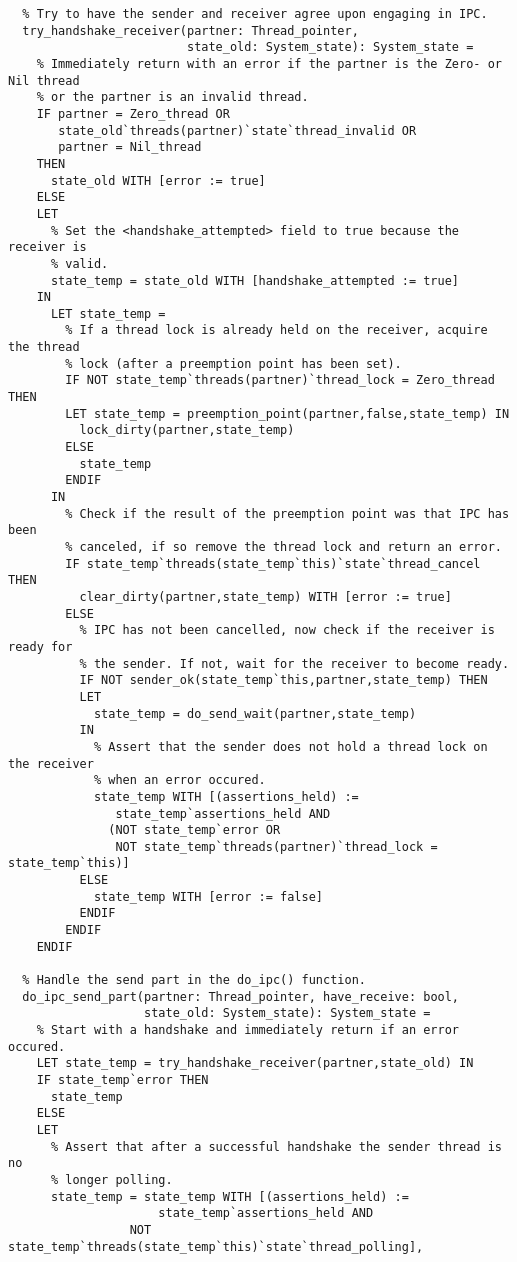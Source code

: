 \begin{lstlisting}
  % Try to have the sender and receiver agree upon engaging in IPC.
  try_handshake_receiver(partner: Thread_pointer, 
                         state_old: System_state): System_state =
    % Immediately return with an error if the partner is the Zero- or Nil thread
    % or the partner is an invalid thread.
    IF partner = Zero_thread OR
       state_old`threads(partner)`state`thread_invalid OR 
       partner = Nil_thread
    THEN
      state_old WITH [error := true]
    ELSE
    LET 
      % Set the <handshake_attempted> field to true because the receiver is 
      % valid.
      state_temp = state_old WITH [handshake_attempted := true] 
    IN
      LET state_temp = 
        % If a thread lock is already held on the receiver, acquire the thread 
        % lock (after a preemption point has been set).
        IF NOT state_temp`threads(partner)`thread_lock = Zero_thread THEN
        LET state_temp = preemption_point(partner,false,state_temp) IN
          lock_dirty(partner,state_temp)
        ELSE
          state_temp
        ENDIF
      IN
        % Check if the result of the preemption point was that IPC has been 
        % canceled, if so remove the thread lock and return an error.
        IF state_temp`threads(state_temp`this)`state`thread_cancel THEN
          clear_dirty(partner,state_temp) WITH [error := true]
        ELSE
          % IPC has not been cancelled, now check if the receiver is ready for
          % the sender. If not, wait for the receiver to become ready.
          IF NOT sender_ok(state_temp`this,partner,state_temp) THEN
          LET
            state_temp = do_send_wait(partner,state_temp)
          IN
            % Assert that the sender does not hold a thread lock on the receiver
            % when an error occured.
            state_temp WITH [(assertions_held) :=
               state_temp`assertions_held AND 
              (NOT state_temp`error OR 
               NOT state_temp`threads(partner)`thread_lock = state_temp`this)]
          ELSE
            state_temp WITH [error := false]
          ENDIF
        ENDIF
    ENDIF 

  % Handle the send part in the do_ipc() function.
  do_ipc_send_part(partner: Thread_pointer, have_receive: bool, 
                   state_old: System_state): System_state =
    % Start with a handshake and immediately return if an error occured.
    LET state_temp = try_handshake_receiver(partner,state_old) IN
    IF state_temp`error THEN
      state_temp   
    ELSE 
    LET 
      % Assert that after a successful handshake the sender thread is no 
      % longer polling.
      state_temp = state_temp WITH [(assertions_held) := 
                     state_temp`assertions_held AND 
                 NOT state_temp`threads(state_temp`this)`state`thread_polling],
    

\end{lstlisting}
